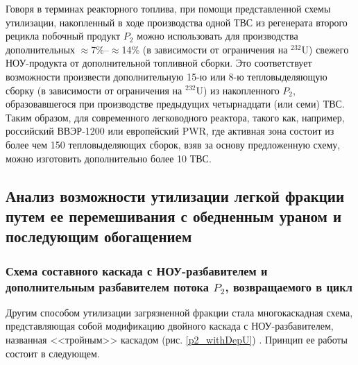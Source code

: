 Говоря в терминах реакторного топлива, при помощи представленной схемы утилизации, накопленный в ходе производства одной ТВС из регенерата второго рецикла побочный продукт $P_2$ можно использовать для производства дополнительных $\approx$7\%--$\approx$14\% (в зависимости от ограничения на $^{232}$U) свежего НОУ-продукта от дополнительной топливной сборки. Это соответствует возможности произвести дополнительную 15-ю или 8-ю тепловыделяющую сборку (в зависимости от ограничения на $^{232}$U) из накопленного $P_2$, образовавшегося при производстве предыдущих четырнадцати (или семи) ТВС. Таким образом, для современного легководного реактора, такого как, например, российский ВВЭР-1200 или европейский PWR, где активная зона состоит из более чем 150 тепловыделяющих сборок, взяв за основу предложенную схему, можно изготовить дополнительно более 10 ТВС. 



\subsection{Анализ возможности утилизации легкой фракции путем ее перемешивания с обедненным ураном и последующим обогащением}

\subsubsection{Схема составного каскада с НОУ-разбавителем и дополнительным разбавителем потока $P_2$, возвращаемого в цикл}

Другим способом утилизации загрязненной фракции стала многокаскадная схема, представляющая собой модификацию двойного каскада с НОУ-разбавителем, названная <<тройным>> каскадом (рис. \ref{p2_withDepU}) \cite{smirnovApplyingEnrichmentCapacities2018}. Принцип ее работы состоит в следующем.

